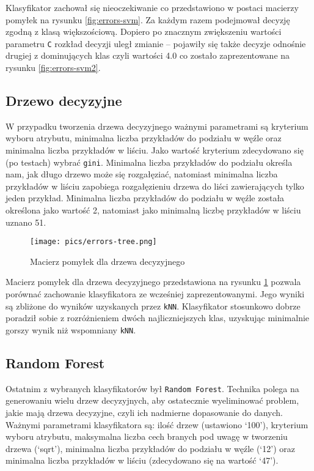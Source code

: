\documentclass{article}
\begin{document}
Klasyfikator zachował się nieoczekiwanie co przedstawiono w postaci macierzy pomyłek na rysunku \ref{fig:errors-svm}. Za każdym razem podejmował decyzję zgodną z klasą większościową. Dopiero po znacznym zwiększeniu wartości parametru \texttt{C} rozkład decyzji uległ zmianie -- pojawiły się także decyzje odnośnie drugiej z dominujących klas czyli wartości 4.0 co zostało zaprezentowane na rysunku \ref{fig:errors-svm2}.

\subsection{Drzewo decyzyjne}
W przypadku tworzenia drzewa decyzyjnego ważnymi parametrami są kryterium wyboru atrybutu, minimalna liczba przykładów do podziału w węźle oraz minimalna liczba przykładów w liściu. Jako wartość kryterium zdecydowano się (po testach) wybrać \texttt{gini}.  Minimalna liczba przykładów do podziału określa nam, jak długo drzewo może się rozgałęziać, natomiast minimalna liczba przykładów w liściu zapobiega rozgałęzieniu drzewa do liści zawierających tylko jeden przykład. Minimalna liczba przykładów do podziału w węźle została określona jako wartość 2, natomiast jako minimalną liczbę przykładów w liściu uznano 51.

\begin{figure}[!h]
\centering
    \texttt{[image: pics/errors-tree.png]}
    \caption{Macierz pomyłek dla drzewa decyzyjnego}
    \label{fig:errors-tree}
\end{figure}

Macierz pomyłek dla drzewa decyzyjnego przedstawiona na rysunku \ref{fig:errors-tree} pozwala porównać zachowanie klasyfikatora ze wcześniej zaprezentowanymi. Jego wyniki są zbliżone do wyników uzyskanych przez \texttt{kNN}. Klasyfikator stosunkowo dobrze poradził sobie z rozróżnieniem dwóch najliczniejszych klas, uzyskując minimalnie gorszy wynik niż wspomniany \texttt{kNN}.

\subsection{Random Forest}
Ostatnim z wybranych klasyfikatorów był \texttt{Random Forest}. Technika polega na generowaniu wielu drzew decyzyjnych, aby ostatecznie wyeliminować problem, jakie mają drzewa decyzyjne, czyli ich nadmierne dopasowanie do danych. Ważnymi parametrami klasyfikatora są: ilość drzew (ustawiono `100'), kryterium wyboru atrybutu, maksymalna liczba cech branych pod uwagę w tworzeniu drzewa (`sqrt'), minimalna liczba przykładów do podziału w węźle (`12') oraz minimalna liczba przykładów w liściu (zdecydowano się na wartość `47').
\end{document}
